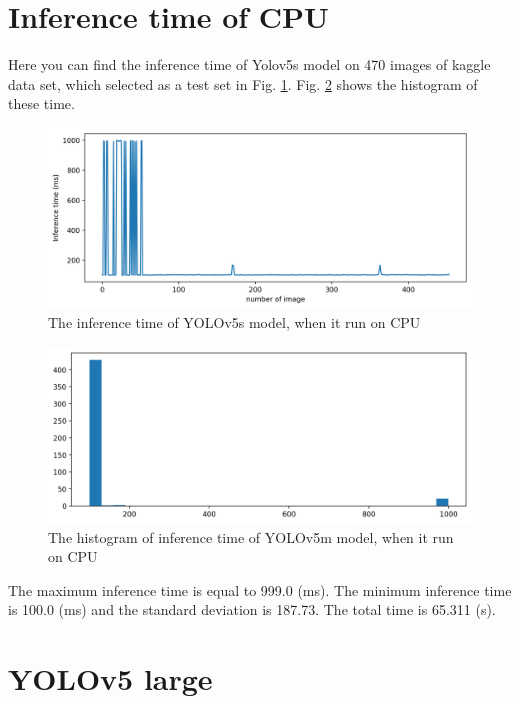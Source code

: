\documentclass[12pt,a4paper]{article}
\begin{document}
\section*{Inference time of CPU}
Here you can find the inference time of Yolov5s model on 470 images of kaggle data set, which selected as a test set in Fig. \ref{fig: cpum}. Fig. \ref{fig: cpum_hist} shows the histogram of these time.
\begin{figure}[H]
    \centering
    \includegraphics[width=15cm]{figures/Inftime_yolov5M_cpu.png}
    \caption{The inference time of YOLOv5s model, when it run on CPU}
    \label{fig: cpum}
\end{figure}
\begin{figure}[H]
    \centering
    \includegraphics[width=15cm]{figures/Inftime_yolov5M_cpu_hist.png}
    \caption{The histogram of inference time of YOLOv5m model, when it run on CPU}
    \label{fig: cpum_hist}
\end{figure}
The maximum inference time is equal to 999.0 (ms). The minimum inference time is 100.0 (ms) and the standard deviation is 187.73. The total time is 65.311 (s).

\section*{YOLOv5 large}
\end{document}
